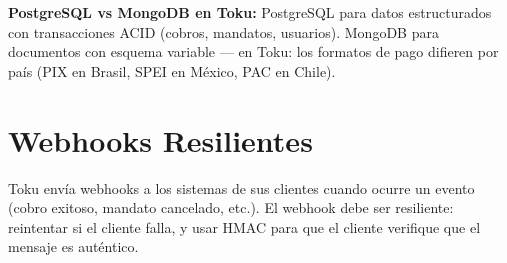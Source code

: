 \documentclass[11pt,a4paper]{article}
\begin{document}
\begin{tipbox}
\textbf{PostgreSQL vs MongoDB en Toku:} PostgreSQL para datos estructurados
con transacciones ACID (cobros, mandatos, usuarios). MongoDB para documentos
con esquema variable --- en Toku: los formatos de pago difieren por país
(PIX en Brasil, SPEI en México, PAC en Chile).
\end{tipbox}

\section{Webhooks Resilientes}

\begin{keybox}
Toku envía webhooks a los sistemas de sus clientes cuando ocurre un evento
(cobro exitoso, mandato cancelado, etc.). El webhook debe ser resiliente:
reintentar si el cliente falla, y usar HMAC para que el cliente verifique
que el mensaje es auténtico.
\end{keybox}
\end{document}
